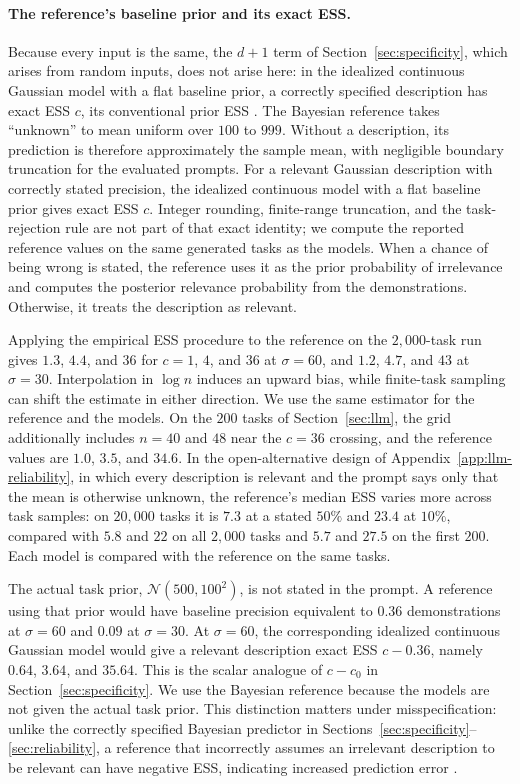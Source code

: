 \documentclass{article}
\theoremstyle{definition}
\begin{document}
\paragraph{The reference's baseline prior and its exact ESS.}
Because every input is the same, the $d+1$ term of Section~\ref{sec:specificity}, which arises from random inputs, does not arise here: in the idealized continuous Gaussian model with a flat baseline prior, a correctly specified description has exact ESS $c$, its conventional prior ESS \citep{neuenschwander2020}. The Bayesian reference takes ``unknown'' to mean uniform over $100$ to $999$. Without a description, its prediction is therefore approximately the sample mean, with negligible boundary truncation for the evaluated prompts. For a relevant Gaussian description with correctly stated precision, the idealized continuous model with a flat baseline prior gives exact ESS $c$. Integer rounding, finite-range truncation, and the task-rejection rule are not part of that exact identity; we compute the reported reference values on the same generated tasks as the models. When a chance of being wrong is stated, the reference uses it as the prior probability of irrelevance and computes the posterior relevance probability from the demonstrations. Otherwise, it treats the description as relevant.

Applying the empirical ESS procedure to the reference on the $2{,}000$-task run gives $1.3$, $4.4$, and $36$ for $c = 1$, $4$, and $36$ at $\sigma = 60$, and $1.2$, $4.7$, and $43$ at $\sigma = 30$. Interpolation in $\log n$ induces an upward bias, while finite-task sampling can shift the estimate in either direction. We use the same estimator for the reference and the models. On the $200$ tasks of Section~\ref{sec:llm}, the grid additionally includes $n = 40$ and $48$ near the $c = 36$ crossing, and the reference values are $1.0$, $3.5$, and $34.6$. In the open-alternative design of Appendix~\ref{app:llm-reliability}, in which every description is relevant and the prompt says only that the mean is otherwise unknown, the reference's median ESS varies more across task samples: on $20{,}000$ tasks it is $7.3$ at a stated $50\%$ and $23.4$ at $10\%$, compared with $5.8$ and $22$ on all $2{,}000$ tasks and $5.7$ and $27.5$ on the first $200$. Each model is compared with the reference on the same tasks.

The actual task prior, $\mathcal{N}(500,100^2)$, is not stated in the prompt. A reference using that prior would have baseline precision equivalent to $0.36$ demonstrations at $\sigma = 60$ and $0.09$ at $\sigma = 30$. At $\sigma = 60$, the corresponding idealized continuous Gaussian model would give a relevant description exact ESS $c-0.36$, namely $0.64$, $3.64$, and $35.64$. This is the scalar analogue of $c-c_0$ in Section~\ref{sec:specificity}. We use the Bayesian reference because the models are not given the actual task prior. This distinction matters under misspecification: unlike the correctly specified Bayesian predictor in Sections~\ref{sec:specificity}--\ref{sec:reliability}, a reference that incorrectly assumes an irrelevant description to be relevant can have negative ESS, indicating increased prediction error \citep{reimherr2021}.
\end{document}
